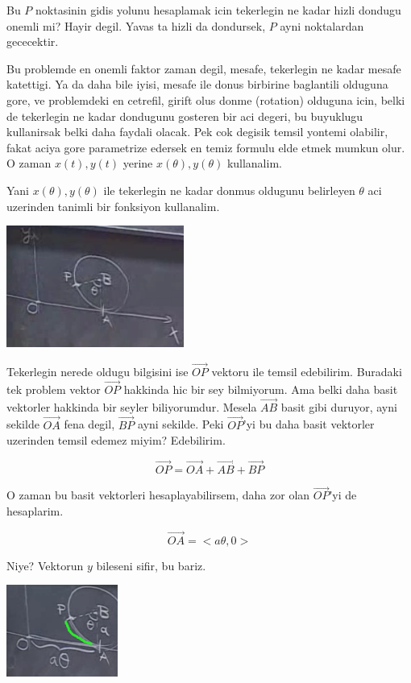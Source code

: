 \documentclass[12pt,fleqn]{article}
\begin{document}
Bu $P$ noktasinin gidis yolunu hesaplamak icin tekerlegin ne kadar hizli
dondugu onemli mi? Hayir degil. Yavas ta hizli da dondursek, $P$ ayni
noktalardan gececektir. 

Bu problemde en onemli faktor zaman degil, mesafe, tekerlegin ne kadar
mesafe katettigi. Ya da daha bile iyisi, mesafe ile donus birbirine
baglantili olduguna gore, ve problemdeki en cetrefil, girift olus donme
(rotation) olduguna icin, belki de tekerlegin ne kadar dondugunu gosteren
bir aci degeri, bu buyuklugu kullanirsak belki daha faydali olacak. Pek cok
degisik temsil yontemi olabilir, fakat aciya gore parametrize edersek en
temiz formulu elde etmek mumkun olur. O zaman $x(t),y(t)$ yerine
$x(\theta),y(\theta)$ kullanalim. 

Yani $x(\theta),y(\theta)$ ile tekerlegin ne kadar donmus oldugunu
belirleyen $\theta$ aci uzerinden tanimli bir fonksiyon kullanalim. 

\includegraphics[height=4cm]{5_4.png}

Tekerlegin nerede oldugu bilgisini ise $\vec{OP}$ vektoru ile temsil
edebilirim. Buradaki tek problem vektor $\vec{OP}$ hakkinda hic bir sey
bilmiyorum. Ama belki daha basit vektorler hakkinda bir seyler
biliyorumdur. Mesela $\vec{AB}$ basit gibi duruyor, ayni sekilde $\vec{OA}$
fena degil, $\vec{BP}$ ayni sekilde. Peki $\vec{OP}$'yi bu daha basit
vektorler uzerinden temsil edemez miyim? Edebilirim. 

\[ \vec{OP} = \vec{OA} + \vec{AB} + \vec{BP}  \]

O zaman bu basit vektorleri hesaplayabilirsem, daha zor olan $\vec{OP}$'yi
de hesaplarim. 

\[ \vec{OA} = <a\theta, 0> \]

Niye? Vektorun $y$ bileseni sifir, bu bariz. 

\includegraphics[height=3cm]{5_5.png}
\end{document}
